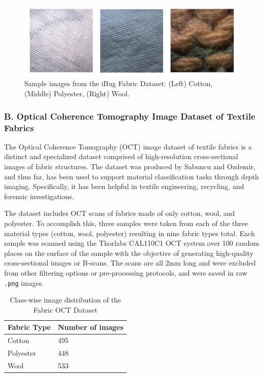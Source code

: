 \begin{figure}[H]
    \centering
    \begin{minipage}{0.8\linewidth}
        \includegraphics[width=\linewidth]{images/iBugDataset}
    \end{minipage}
    \caption[Sample images from the iBug Fabric Dataset]{Sample images from the iBug Fabric Dataset: (Left) Cotton, (Middle) Polyester, (Right) Wool.}
\end{figure}

\subsubsection{B. Optical Coherence Tomography Image Dataset of Textile Fabrics~\cite{sabuncu2022optical}}

The Optical Coherence Tomography (OCT) image dataset of textile fabrics is a distinct and specialized dataset comprised of high-resolution cross-sectional images of fabric structures. The dataset was produced by Sabuncu and Ozdemir, and thus far, has been used to support material classification tasks through depth imaging. Specifically, it has been helpful in textile engineering, recycling, and forensic investigations. 

The dataset includes OCT scans of fabrics made of only cotton, wool, and polyester. To accomplish this, three samples were taken from each of the three material types (cotton, wool, polyester) resulting in nine fabric types total. Each sample was scanned using the Thorlabs CAL110C1 OCT system over 100 random places on the surface of the sample with the objective of generating high-quality cross-sectional images or B-scans. The scans are all 2mm long and were excluded from other filtering options or pre-processing protocols, and were saved in raw \texttt{.png} images.

\begin{table}[H]
\centering
\caption{Class-wise image distribution of the Fabric OCT Dataset}
\begin{tabular}{ll}
\toprule
\textbf{Fabric Type} & \textbf{Number of images} \\
\midrule
Cotton & 495 \\
Polyester & 448 \\
Wool & 533 \\
\bottomrule
\end{tabular}
\end{table}

